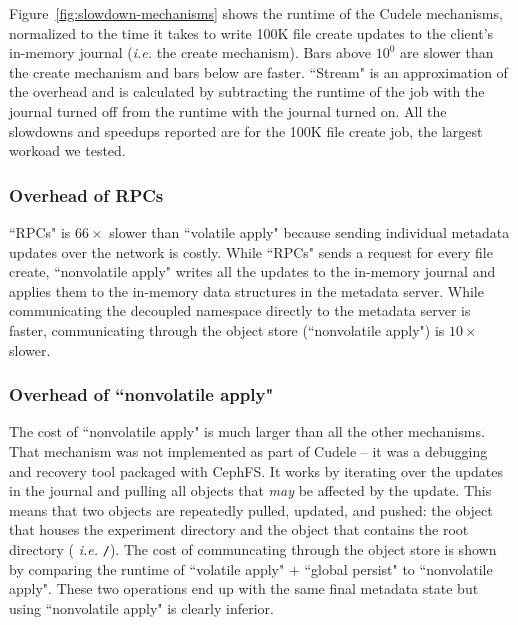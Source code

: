 Figure~\ref{fig:slowdown-mechanisms} shows the runtime of the Cudele
mechanisms, normalized to the time it takes to write 100K file create updates
to the client's in-memory journal ({\it i.e.} the create mechanism). Bars above
\(10^0\) are slower than the create mechanism and bars below are faster.
``Stream" is an approximation of the overhead and is calculated by subtracting
the runtime of the job with the journal turned off from the runtime with the
journal turned on. All the slowdowns and speedups reported are for the 100K
file create job, the largest workoad we tested.

\subsubsection{Overhead of RPCs} ``RPCs" is \(66\times\) slower than ``volatile
apply" because sending individual metadata updates over the network is costly.
While ``RPCs" sends a request for every file create, ``nonvolatile apply"
writes all the updates to the in-memory journal and applies them to the
in-memory data structures in the metadata server. While communicating the
decoupled namespace directly to the metadata server is faster, communicating
through the object store (``nonvolatile apply") is \(10\times\) slower.

\subsubsection{Overhead of ``nonvolatile apply"} The cost of ``nonvolatile
apply" is much larger than all the other mechanisms.  That mechanism was not
implemented as part of Cudele -- it was a debugging and recovery tool packaged
with CephFS. It works by iterating over the updates in the journal and pulling
all objects that {\it may} be affected by the update.  This means that two
objects are repeatedly pulled, updated, and pushed: the object that houses the
experiment directory and the object that contains the root directory ({\it
i.e.} \texttt{/}).  The cost of communcating through the object store is shown
by comparing the runtime of ``volatile apply" + ``global persist" to
``nonvolatile apply". These two operations end up with the same final metadata
state but using ``nonvolatile apply" is clearly inferior.

